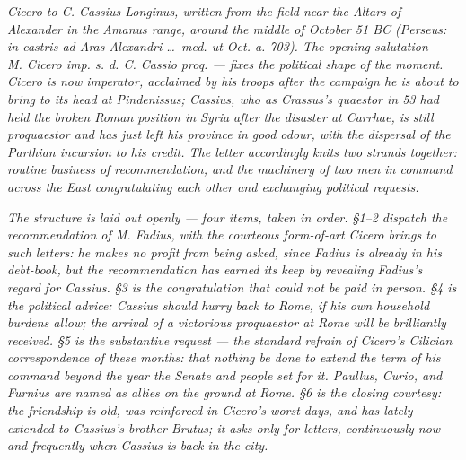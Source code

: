 
\textit{Cicero to C. Cassius Longinus, written from the field
near the Altars of Alexander in the Amanus range, around the
middle of October 51 BC (Perseus: \textit{in castris ad Aras
Alexandri \dots\ med. ut Oct. a. 703}). The opening
salutation --- \textit{M. Cicero imp. s. d. C. Cassio proq.} ---
fixes the political shape of the moment. Cicero is now imperator,
acclaimed by his troops after the campaign he is about to bring
to its head at Pindenissus; Cassius, who as Crassus's quaestor
in 53 had held the broken Roman position in Syria after the
disaster at Carrhae, is still proquaestor and has just left
his province in good odour, with the dispersal of the Parthian
incursion to his credit. The letter accordingly knits two
strands together: routine business of recommendation, and the
machinery of two men in command across the East congratulating
each other and exchanging political requests.}

\textit{The structure is laid out openly --- four items, taken
in order. \S 1--2 dispatch the recommendation of M. Fadius, with
the courteous form-of-art Cicero brings to such letters: he
makes no profit from being asked, since Fadius is already in his
debt-book, but the recommendation has earned its keep by
revealing Fadius's regard for Cassius. \S 3 is the
congratulation that could not be paid in person. \S 4 is the
political advice: Cassius should hurry back to Rome, if his
own household burdens allow; the arrival of a victorious
proquaestor at Rome will be brilliantly received. \S 5 is the
substantive request --- the standard refrain of Cicero's
Cilician correspondence of these months: that nothing be done
to extend the term of his command beyond the year the Senate and
people set for it. Paullus, Curio, and Furnius are named as
allies on the ground at Rome. \S 6 is the closing courtesy: the
friendship is old, was reinforced in Cicero's worst days, and
has lately extended to Cassius's brother Brutus; it asks only
for letters, continuously now and frequently when Cassius is
back in the city.}
